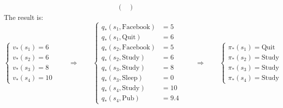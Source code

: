 \begin{homeworkProblem}
\begin{align*}
\begin{pmatrix}
\end{pmatrix}
\end{align*}
The result is:
$$\begin{cases}
v_*(s_1) = 6 \\
v_*(s_2) = 6 \\
v_*(s_3) = 8 \\
v_*(s_4) = 10
\end{cases} \qquad \Rightarrow \qquad \begin{cases}
q_*(s_1, \text{Facebook}) &= 5 \\
q_*(s_1, \text{Quit}) &= 6 \\
q_*(s_2, \text{Facebook}) &= 5 \\
q_*(s_2, \text{Study}) &= 6 \\
q_*(s_3, \text{Study}) &= 8 \\
q_*(s_3, \text{Sleep}) &= 0 \\
q_*(s_4, \text{Study}) &= 10 \\
q_*(s_4, \text{Pub}) &= 9.4
\end{cases} \qquad \Rightarrow \qquad \begin{cases}
\pi_*(s_1) = \text{Quit} \\
\pi_*(s_2) = \text{Study} \\
\pi_*(s_3) = \text{Study} \\
\pi_*(s_4) = \text{Study}
\end{cases}$$


\end{homeworkProblem}
